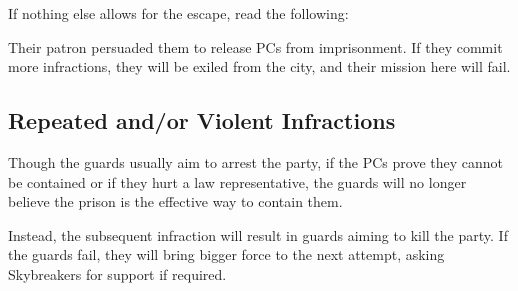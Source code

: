 If nothing else allows for the escape, read the following:


Their patron persuaded them to release PCs from imprisonment. If they commit more infractions, they will be exiled from the city, and their mission here will fail.



\subsection{Repeated and/or Violent Infractions}

Though the guards usually aim to arrest the party, if the PCs prove they cannot be contained or if they hurt a law representative, the guards will no longer believe the prison is the effective way to contain them.

Instead, the subsequent infraction will result in guards aiming to kill the party. If the guards fail, they will bring bigger force to the next attempt, asking Skybreakers for support if required.
